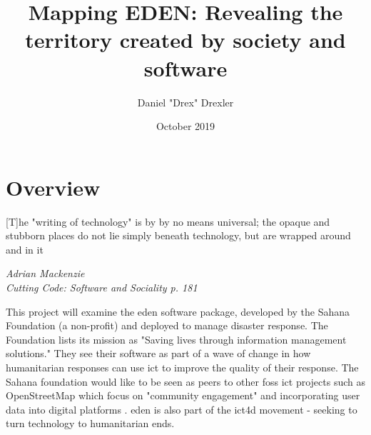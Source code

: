 \documentclass[a4paper,man,natbib]{apa6}
\title{Mapping EDEN: Revealing the territory created by society and software}
\author{Daniel "Drex" Drexler}
\affiliation{Center for Science, Technology and Society at Drexel University}
\date{October 2019}
\begin{document}
   \maketitle
   \section*{Overview}
   \epigraph{[T]he "writing of technology" is by by no means universal; the opaque and stubborn places do not lie simply beneath technology, but are wrapped around and in it}{\textit{Adrian Mackenzie \\ Cutting Code: Software and Sociality p. 181}}

   This project will examine the \acrfull{eden} software package, developed by the Sahana Foundation (a non-profit) and deployed to manage disaster response. The Foundation lists its mission as "Saving lives through information management solutions." They see their software as part of a wave of change in how humanitarian responses can use \acrshort{ict} to improve the quality of their response. The Sahana foundation would like to be seen as peers to other \acrfull{foss} \acrshort{ict} projects such as \Gls{OpenStreetMap} which focus on "community engagement" and incorporating user data into digital platforms \citep{Sahana_Foundation_undated-hl}. \acrshort{eden} is also part of the \acrfull{ict4d} movement - seeking to turn technology to humanitarian ends.  
\end{document}
